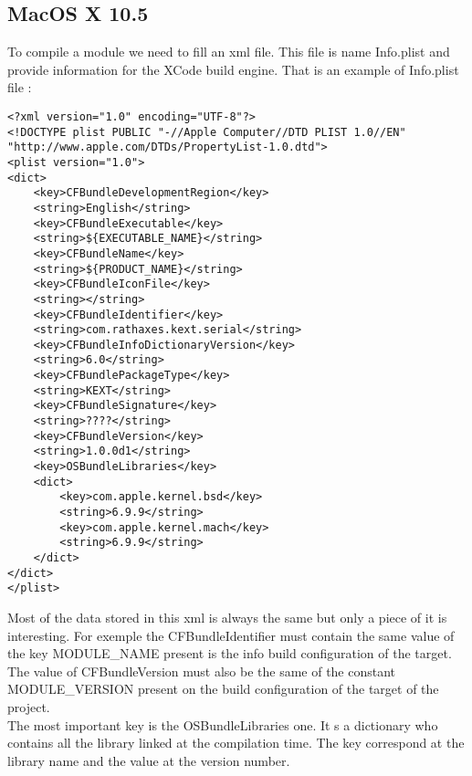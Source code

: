 \documentclass[11pt]{report}
\begin{document}
  \subsection{MacOS X 10.5}
To compile a module we need to fill an xml file. This file is name Info.plist and provide information for the XCode build engine.
That is an example of Info.plist file :
    \begin{lstlisting}
<?xml version="1.0" encoding="UTF-8"?>
<!DOCTYPE plist PUBLIC "-//Apple Computer//DTD PLIST 1.0//EN" "http://www.apple.com/DTDs/PropertyList-1.0.dtd">
<plist version="1.0">
<dict>
	<key>CFBundleDevelopmentRegion</key>
	<string>English</string>
	<key>CFBundleExecutable</key>
	<string>${EXECUTABLE_NAME}</string>
	<key>CFBundleName</key>
	<string>${PRODUCT_NAME}</string>
	<key>CFBundleIconFile</key>
	<string></string>
	<key>CFBundleIdentifier</key>
	<string>com.rathaxes.kext.serial</string>
	<key>CFBundleInfoDictionaryVersion</key>
	<string>6.0</string>
	<key>CFBundlePackageType</key>
	<string>KEXT</string>
	<key>CFBundleSignature</key>
	<string>????</string>
	<key>CFBundleVersion</key>
	<string>1.0.0d1</string>
	<key>OSBundleLibraries</key>
	<dict>
		<key>com.apple.kernel.bsd</key>
		<string>6.9.9</string>
		<key>com.apple.kernel.mach</key>
		<string>6.9.9</string>
	</dict>
</dict>
</plist>
    \end{lstlisting}
Most of the data stored in this xml is always the same but only a piece of it is interesting. For exemple the CFBundleIdentifier must contain the same value of the key MODULE\_NAME present is the info build configuration of the target. The value of CFBundleVersion must also be the same of the constant MODULE\_VERSION present on the build configuration of the target of the project.\\
The most important key is the OSBundleLibraries one. It s a dictionary who contains all the library linked at the compilation time. The key correspond at the library name and the value at the version number.\\
\end{document}
